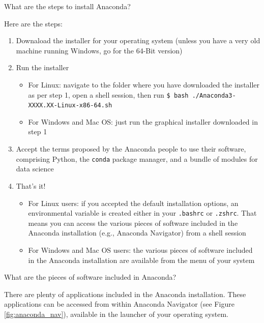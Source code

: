 \documentclass[a4paper,11pt]{book}
\newcommand{\question}[1]{%
    \begin{tcolorbox}[colback=comp_c!10,colframe=comp_c,sidebyside align=top,width=\linewidth,before skip=1ex]
        #1
    \end{tcolorbox}
    \switchcolumn%
}
\newcommand{\note}[1]{%
    \begin{tcolorbox}[colback=white!0,colframe=white!10,width=\linewidth,before skip=1ex]
        #1
    \end{tcolorbox}
}
\begin{document}
\begin{paracol}{2}
	\question{\raggedright What are the steps to install Anaconda?}
	\note{
	
	Here are the steps:

	\begin{enumerate}
		\item Downaload the installer for your operating system (unless you have a very old machine running Windows, go for the 64-Bit version)
		\item Run the installer
		\begin{itemize}
			\item For Linux: navigate to the folder where you have downloaded the installer as per step 1, open a shell session, then run \texttt{\$ bash ./Anaconda3-XXXX.XX-Linux-x86-64.sh}
			\item For Windows and Mac OS: just run the graphical installer downloaded in step 1
		\end{itemize}
		\item Accept the terms proposed by the Anaconda people to use their software, comprising Python, the \texttt{conda} package manager, and a bundle of modules for data science
		\item That's it!
		\begin{itemize}
		\item For Linux users: if you accepted the default installation options, an environmental variable is created either in your \texttt{.bashrc} or \texttt{.zshrc}. That means you can access the various pieces of software included in the Anaconda installation (e.g., Anaconda Navigator) from a shell session
		\item For Windows and Mac OS users: the various pieces of software included in the Anaconda installation are available from the menu of your system
		\end{itemize}
	\end{enumerate}

	}
\end{paracol}

\begin{paracol}{2}
	\question{\raggedright What are the pieces of software included in Anaconda?}
	\note{There are plenty of applications included in the Anaconda installation. These applications can be accessed from within Anaconda Navigator (see Figure \ref{fig:anaconda_nav}), available in the launcher of your operating system.}
\end{paracol}
\end{document}
